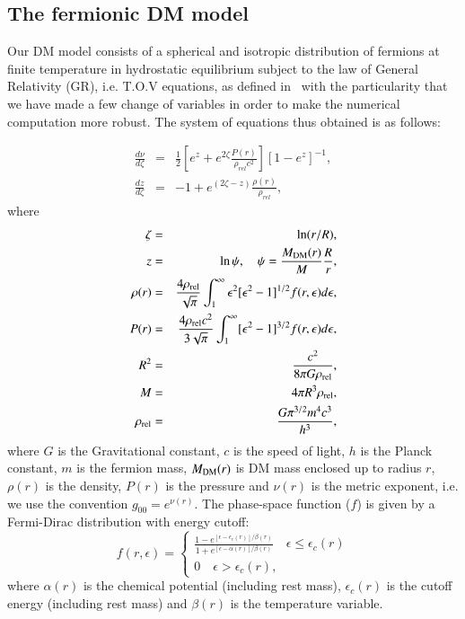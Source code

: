 \documentclass[twocolumn]{aa}
\begin{document}
\subsection{The fermionic DM model}
Our DM model consists of a spherical and isotropic distribution of fermions at finite temperature in hydrostatic equilibrium subject to the law of General Relativity (GR), i.e. T.O.V equations, as defined in~\cite{arguelles_novel_2018} with the particularity that we have made a few change of variables in order to make the numerical computation more robust. The system of equations thus obtained is as follows:

\begin{eqnarray}
   \label{sode}
   \frac{d\nu}{d\zeta} & = & \frac{1}{2}\left[e^{z}+e^{2\zeta}\frac{P(r)}{\rho_{rel}c^2}\right][1-e^{z}]^{-1},\\
   \frac{dz}{d\zeta} & = &-1+e^{(2\zeta-z)}\frac{\rho(r)}{\rho_{rel}},
\end{eqnarray}
where
\begin{eqnarray}
   \zeta &=& \ln(r/R),\\
   z &=&\ln\psi,\quad \psi = \frac{M_{\rm{DM}}(r)}{M}\frac{R}{r},\label{mass_dm}\\
   \rho(r)&=&\frac{4\rho_{\rm rel}}{\sqrt{\pi}}\int^\infty_1\epsilon^2[\epsilon^2-1]^{1/2}f(r,\epsilon)d\epsilon,\\
   P(r)&=&\frac{4\rho_{\rm rel}c^2}{3\sqrt{\pi}}\int^\infty_1[\epsilon^2-1]^{3/2}f(r,\epsilon)d\epsilon,\\
   R^2 &=& \frac{c^2}{8\pi G \rho_{\rm{rel}}},\\
   M &=& 4\pi R^3 \rho_{\rm{rel}},\\
   \rho_{\rm{rel}}&=& \frac{ G\pi^{3/2} m^4 c^3}{h^3},
\end{eqnarray}
where $G$ is the Gravitational constant, $c$ is the speed of light, $h$ is the Planck constant, $m$ is the fermion mass, $M_{\rm{DM}}(r)$ is DM mass enclosed up to radius $r$, $\rho(r)$ is the density, $P(r)$ is the pressure and $\nu(r)$ is the metric exponent, i.e. we use the convention $g_{00}=e^{\nu(r)}$. The phase-space function ($f$) is given by a Fermi-Dirac distribution with energy cutoff:
\begin{equation}
f(r,\epsilon)=
   \begin{cases}
      \frac{\displaystyle{1-e^{[\epsilon-\epsilon_c(r)]/\beta(r)}}}
      {\displaystyle{1+e^{[\epsilon-\alpha(r)]/\beta(r)}}}\quad \epsilon \leq \epsilon_c(r)\\
      0\quad \epsilon > \epsilon_c(r),
   \end{cases}
\end{equation}
where $\alpha(r)$ is the chemical potential (including rest mass), $\epsilon_c(r)$ is the cutoff
energy (including rest mass) and $\beta(r)$ is the temperature variable.
\end{document}
